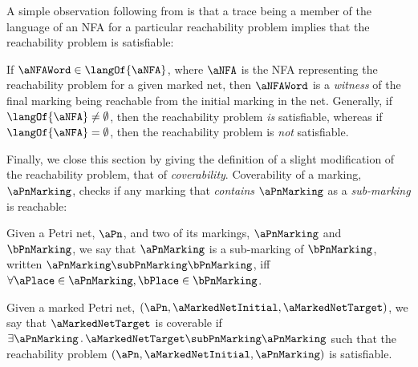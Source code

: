 A simple observation following from 
is that a trace being a member of the language of an NFA for a particular
reachability problem implies that the reachability problem is satisfiable:

\begin{remark}\label{rem:nonEmptyLanguageImpliesReachability}
If $\aNFAWord \in \langOf{\aNFA}$, where $\aNFA$ is the NFA representing the
reachability problem for a given marked net, then $\aNFAWord$ is a
\emph{witness} of the final marking being reachable from the initial marking in
the net. Generally, if $\langOf{\aNFA} \neq \emptyset$, then the reachability
problem \emph{is} satisfiable, whereas if $\langOf{\aNFA} = \emptyset$, then
the reachability problem is \emph{not} satisfiable.
\end{remark}

Finally, we close this section by giving the definition of a slight
modification of the reachability problem, that of \emph{coverability}.
Coverability of a marking, $\aPnMarking$, checks if any marking that
\emph{contains} $\aPnMarking$ as a \emph{sub-marking} is reachable:

\begin{definition}
    Given a Petri net, $\aPn$, and two of its markings, $\aPnMarking$ and
    $\bPnMarking$, we say that $\aPnMarking$ is a sub-marking of $\bPnMarking$,
    written $\aPnMarking \subPnMarking \bPnMarking$, iff $\forall \aPlace \in
    \aPnMarking, \bPlace \in \bPnMarking$.
\end{definition}

\begin{definition}[Coverability]
    Given a marked Petri net, $(\aPn, \aMarkedNetInitial, \aMarkedNetTarget)$,
    we say that $\aMarkedNetTarget$ is coverable if $\exists \aPnMarking \,.\,
    \aMarkedNetTarget \subPnMarking \aPnMarking$ such that the reachability
    problem $(\aPn, \aMarkedNetInitial, \aPnMarking)$ is satisfiable.
\end{definition}

